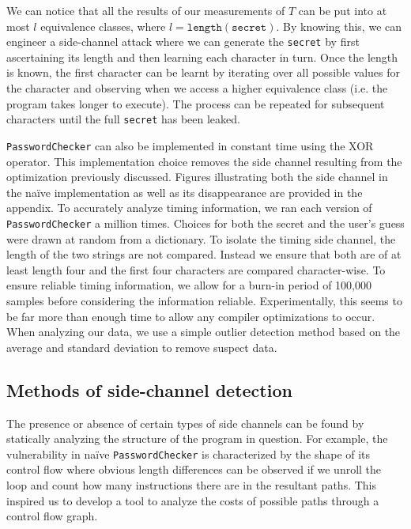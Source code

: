 We can notice that all the results of our measurements of $T$ can be put into at most $l$ equivalence classes, where $l = \texttt{length}(\texttt{secret})$. By knowing this, we can engineer a side-channel
attack where we can generate the \texttt{secret} by first ascertaining its length and then learning each character in turn. Once the length is known, the first character can be learnt by iterating over all possible values for the character and observing when we access a higher equivalence class (i.e. the program takes longer to execute). The process can be repeated for subsequent characters until the full \texttt{secret} has been leaked.

\texttt{PasswordChecker} can also be implemented in constant time using the XOR operator. This implementation choice removes the side channel resulting from the optimization previously discussed. Figures illustrating both the side channel in the na\"ive implementation as well as its disappearance are provided in the appendix. To accurately analyze timing information, we ran each version of \texttt{PasswordChecker} a million times. Choices for both the secret and the user's guess were drawn at random from a dictionary. To isolate the timing side channel, the length of the two strings are not compared. Instead we ensure that both are of at least length four and the first four characters are compared character-wise. To ensure reliable timing information, we allow for a burn-in period of 100,000 samples before considering the information reliable. Experimentally, this seems to be far more than enough time to allow any compiler optimizations to occur. When analyzing our data, we use a simple outlier detection method based on the average and standard deviation to remove suspect data.   




\subsection{Methods of side-channel detection}

The presence or absence of certain types of side channels can be found by 
statically analyzing the structure of the program in question. For example, the vulnerability in na\"ive \texttt{PasswordChecker} is characterized by the shape of its control flow where obvious length
differences can be observed if we unroll the loop and count how many instructions there are in the resultant
paths. This inspired us to develop a tool to analyze the costs of possible paths through a control flow graph. 

